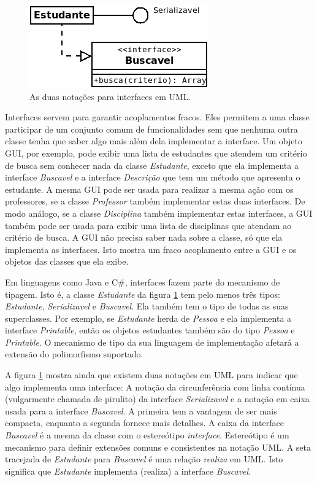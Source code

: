 \documentclass[
	11pt,				%
	openright,
	twoside,			%
	a4paper,			%
	english,			%
	french,
	brazil,				%
	sumario=tradicional
	]{abntex2}
\begin{document}
\begin{figure}[h]
\begin{center}
\includegraphics[scale=0.7]{ifcUml.png}
\end{center}
\caption{As duas notações para interfaces em UML.} \label{fig:ifcUml}
\end{figure}

Interfaces servem para garantir acoplamentos fracos. Eles permitem a uma classe participar de um conjunto comum de funcionalidades sem que nenhuma outra classe tenha que saber algo mais além dela implementar a interface. Um objeto GUI, por exemplo, pode exibir uma lista de estudantes que atendem um critério de busca sem conhecer nada da classe \emph{Estudante}, exceto que ela implementa a interface \emph{Buscavel} e a interface \emph{Descrição} que tem um método que apresenta o estudante. A mesma GUI pode ser usada para realizar a mesma ação com os professores, se a classe \emph{Professor} também implementar estas duas interfaces. De modo análogo, se a classe \emph{Disciplina} também implementar estas interfaces, a GUI também pode ser usada para exibir uma lista de disciplinas que atendam ao critério de busca. A GUI não precisa saber nada sobre a classe, só que ela implementa as interfaces. Isto mostra um fraco acoplamento entre a GUI e os objetos das classes que ela exibe.

Em linguagens como Java e C\#, interfaces fazem parte do mecanismo de tipagem. Isto é, a classe \emph{Estudante} da figura \ref{fig:ifcUml} tem pelo menos três tipos: \emph{Estudante}, \emph{Serializavel} e \emph{Buscavel}. Ela também tem o tipo de todas as suas superclasses. Por exemplo, se \emph{Estudante} herda de \emph{Pessoa} e ela implementa a interface \emph{Printable}, então os objetos estudantes também são do tipo \emph{Pessoa} e \emph{Printable}. O mecanismo de tipo da sua linguagem de implementação afetará a extensão do polimorfismo suportado.

A figura \ref{fig:ifcUml} mostra ainda que existem duas notações em UML para indicar que algo implementa uma interface: A notação da circunferência com linha contínua (vulgarmente chamada de pirulito) da interface \emph{Serializavel} e a notação em caixa usada para a interface \emph{Buscavel}. A primeira tem a vantagem de ser mais compacta, enquanto a segunda fornece mais detalhes. A caixa da interface \emph{Buscavel} é a mesma da classe com o estereótipo \emph{interface}. Estereótipo é um mecanismo para definir extensões comuns e consistentes na notação UML. A seta tracejada de \emph{Estudante} para \emph{Buscavel} é uma relação \emph{realiza} em UML. Isto significa que \emph{Estudante} implementa (realiza) a interface \emph{Buscavel}.
\end{document}
